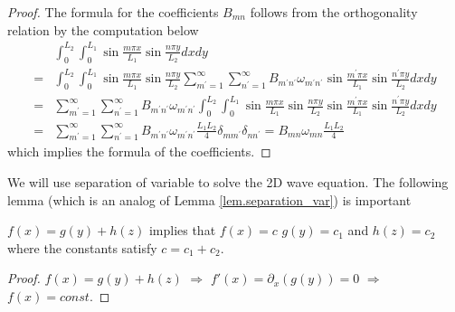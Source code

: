 \begin{proof}
The formula for the coefficients $B_{mn}$ follows from the orthogonality relation by the computation below
$$
\begin{aligned}
& \int_0^{L_2} \int_0^{L_1} \sin \frac{m \pi x}{L_1} \sin \frac{n \pi y}{L_2} d x d y \\
= & \int_0^{L_2} \int_0^{L_1} \sin \frac{m \pi x}{L_1} \sin \frac{n \pi y}{L_2} \sum_{m^{\prime}=1}^{\infty} \sum_{n^{\prime}=1}^{\infty} B_{m^{\prime} n^{\prime}} \omega_{m^{\prime} n^{\prime}} \sin \frac{m^{\prime} \pi x}{L_1} \sin \frac{n^{\prime} \pi y}{L_2} d x d y \\
= & \sum_{m^{\prime}=1}^{\infty} \sum_{n^{\prime}=1}^{\infty} B_{m^{\prime} n^{\prime}} \omega_{m^{\prime} n^{\prime}} \int_0^{L_2} \int_0^{L_1} \sin \frac{m \pi x}{L_1} \sin \frac{n \pi y}{L_2} \sin \frac{m^{\prime} \pi x}{L_1} \sin \frac{n^{\prime} \pi y}{L_2} d x d y \\
= & \sum_{m^{\prime}=1}^{\infty} \sum_{n^{\prime}=1}^{\infty} B_{m^{\prime} n^{\prime}} \omega_{m^{\prime} n^{\prime}} \frac{L_1 L_2}{4} \delta_{m m^{\prime}} \delta_{n n^{\prime}}=B_{m n} \omega_{m n} \frac{L_1 L_2}{4}
\end{aligned}
$$
which implies the formula of the coefficients.
\end{proof}

We will use separation of variable to solve the 2D wave equation. The following lemma (which is an analog of Lemma \ref{lem.separation_var}) is important
\begin{lemma}[]\label{lem.separation_var_2D}
    $f(x) = g(y) + h(z)$ implies that $f(x) = c$ $g(y) = c_1$ and $h(z) = c_2$ where the constants satisfy $c = c_1 + c_2$.
\end{lemma}
\begin{proof}
    $f(x) = g(y) + h(z)$ $\Rightarrow$ $f'(x) = \partial_x (g(y)) = 0$ $\Rightarrow$ $f(x) = \textit{const}$.
\end{proof}

